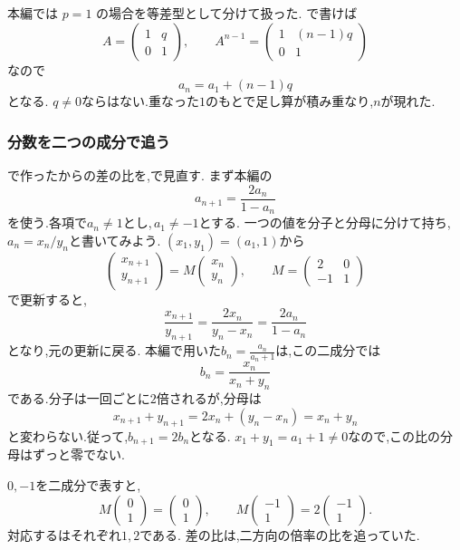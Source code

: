 本編では $p=1$ の場合を等差型として分けて扱った.
で書けば
\[
  A=\begin{pmatrix}1&q\\0&1\end{pmatrix},
  \qquad
  A^{n-1}=\begin{pmatrix}1&(n-1)q\\0&1\end{pmatrix}
\]
なので
\[
  a_n=a_1+(n-1)q
\]
となる.
$q\ne0$ならはない.重なった$1$のもとで足し算が積み重なり,$n$が現れた.



\subsubsection{分数を二つの成分で追う}\label{節：一次分数型を行列で見直す}

で作ったからの差の比を,で見直す.
まず本編の
\[
  a_{n+1}=\frac{2a_n}{1-a_n}
\]
を使う.各項で$a_n\ne1$とし,\,$a_1\ne-1$とする.
一つの値を分子と分母に分けて持ち,$a_n=x_n/y_n$と書いてみよう.
$(x_1,y_1)=(a_1,1)$から
\[
  \begin{pmatrix}x_{n+1}\\y_{n+1}\end{pmatrix}
  =M\begin{pmatrix}x_n\\y_n\end{pmatrix},
  \qquad
  M=\begin{pmatrix}2&0\\-1&1\end{pmatrix}
\]
で更新すると,
\[
  \frac{x_{n+1}}{y_{n+1}}
  =\frac{2x_n}{y_n-x_n}
  =\frac{2a_n}{1-a_n}
\]
となり,元の更新に戻る.
本編で用いた$\displaystyle b_n=\frac{a_n}{a_n+1}$は,この二成分では
\[
  b_n=\frac{x_n}{x_n+y_n}
\]
である.分子は一回ごとに$2$倍されるが,分母は
\[
  x_{n+1}+y_{n+1}=2x_n+(y_n-x_n)=x_n+y_n
\]
と変わらない.従って,$b_{n+1}=2b_n$となる.
$x_1+y_1=a_1+1\ne0$なので,この比の分母はずっと零でない.

$0,-1$を二成分で表すと,
\[
  M\begin{pmatrix}0\\1\end{pmatrix}
  =\begin{pmatrix}0\\1\end{pmatrix},
  \qquad
  M\begin{pmatrix}-1\\1\end{pmatrix}
  =2\begin{pmatrix}-1\\1\end{pmatrix}.
\]
対応するはそれぞれ$1,2$である.
差の比は,二方向の倍率の比を追っていた.

